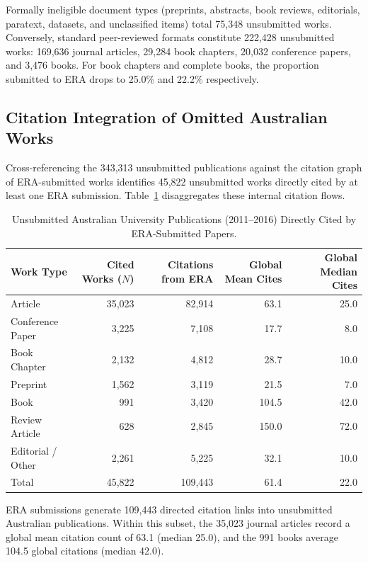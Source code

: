 Formally ineligible document types (preprints, abstracts, book reviews, editorials, paratext, datasets, and unclassified items) total 75,348 unsubmitted works. Conversely, standard peer-reviewed formats constitute 222,428 unsubmitted works: 169,636 journal articles, 29,284 book chapters, 20,032 conference papers, and 3,476 books. For book chapters and complete books, the proportion submitted to ERA drops to 25.0\% and 22.2\% respectively.

\subsection{Citation Integration of Omitted Australian Works}

Cross-referencing the 343,313 unsubmitted publications against the citation graph of ERA-submitted works identifies 45,822 unsubmitted works directly cited by at least one ERA submission. Table~\ref{tab:cited_unsubmitted} disaggregates these internal citation flows.

\begin{table}[htbp]
\centering
\caption{Unsubmitted Australian University Publications (2011--2016) Directly Cited by ERA-Submitted Papers.}
\label{tab:cited_unsubmitted}
\begin{tabular*}{\textwidth}{@{\extracolsep{\fill}}lrrrr@{}}
\toprule
Work Type & Cited Works ($N$) & Citations from ERA & Global Mean Cites & Global Median Cites \\
\midrule
Article             & 35,023 & 82,914 &  63.1 & 25.0 \\
Conference Paper    &  3,225 &  7,108 &  17.7 &  8.0 \\
Book Chapter        &  2,132 &  4,812 &  28.7 & 10.0 \\
Preprint            &  1,562 &  3,119 &  21.5 &  7.0 \\
Book                &    991 &  3,420 & 104.5 & 42.0 \\
Review Article      &    628 &  2,845 & 150.0 & 72.0 \\
Editorial / Other   &  2,261 &  5,225 &  32.1 & 10.0 \\
\midrule
Total               & 45,822 & 109,443 & 61.4 & 22.0 \\
\bottomrule
\end{tabular*}
\end{table}

ERA submissions generate 109,443 directed citation links into unsubmitted Australian publications. Within this subset, the 35,023 journal articles record a global mean citation count of 63.1 (median 25.0), and the 991 books average 104.5 global citations (median 42.0).


